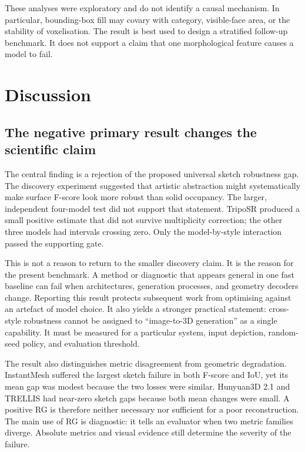 \documentclass[12pt,a4paper]{article}
\begin{document}
These analyses were exploratory and do not identify a causal mechanism. In particular, bounding-box fill may covary with category, visible-face area, or the stability of voxelisation. The result is best used to design a stratified follow-up benchmark. It does not support a claim that one morphological feature causes a model to fail.

\section{Discussion}

\subsection{The negative primary result changes the scientific claim}

The central finding is a rejection of the proposed universal sketch robustness gap. The discovery experiment suggested that artistic abstraction might systematically make surface F-score look more robust than solid occupancy. The larger, independent four-model test did not support that statement. TripoSR produced a small positive estimate that did not survive multiplicity correction; the other three models had intervals crossing zero. Only the model-by-style interaction passed the supporting gate.

This is not a reason to return to the smaller discovery claim. It is the reason for the present benchmark. A method or diagnostic that appears general in one fast baseline can fail when architectures, generation processes, and geometry decoders change. Reporting this result protects subsequent work from optimising against an artefact of model choice. It also yields a stronger practical statement: cross-style robustness cannot be assigned to \enquote{image-to-3D generation} as a single capability. It must be measured for a particular system, input depiction, random-seed policy, and evaluation threshold.

The result also distinguishes metric disagreement from geometric degradation. InstantMesh suffered the largest sketch failure in both F-score and IoU, yet its mean gap was modest because the two losses were similar. Hunyuan3D 2.1 and TRELLIS had near-zero sketch gaps because both mean changes were small. A positive RG is therefore neither necessary nor sufficient for a poor reconstruction. The main use of RG is diagnostic: it tells an evaluator when two metric families diverge. Absolute metrics and visual evidence still determine the severity of the failure.
\end{document}
